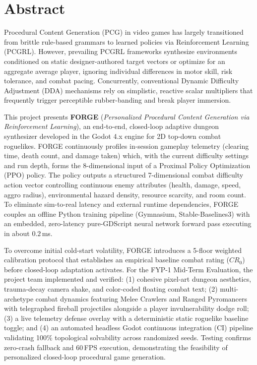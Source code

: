\chapter*{Abstract}

Procedural Content Generation (PCG) in video games has largely transitioned from brittle rule-based grammars to learned policies via Reinforcement Learning (PCGRL). However, prevailing PCGRL frameworks synthesize environments conditioned on static designer-authored target vectors or optimize for an aggregate average player, ignoring individual differences in motor skill, risk tolerance, and combat pacing. Concurrently, conventional Dynamic Difficulty Adjustment (DDA) mechanisms rely on simplistic, reactive scalar multipliers that frequently trigger perceptible rubber-banding and break player immersion.

This project presents \textbf{FORGE} (\textit{Personalized Procedural Content Generation via Reinforcement Learning}), an end-to-end, closed-loop adaptive dungeon synthesizer developed in the Godot 4.x engine for 2D top-down combat roguelikes. FORGE continuously profiles in-session gameplay telemetry (clearing time, death count, and damage taken) which, with the current difficulty settings and run depth, forms the 8-dimensional input of a Proximal Policy Optimization (PPO) policy. The policy outputs a structured 7-dimensional combat difficulty action vector controlling continuous enemy attributes (health, damage, speed, aggro radius), environmental hazard density, resource scarcity, and room count. To eliminate sim-to-real latency and external runtime dependencies, FORGE couples an offline Python training pipeline (Gymnasium, Stable-Baselines3) with an embedded, zero-latency pure-GDScript neural network forward pass executing in about $0.2$\,ms. 

To overcome initial cold-start volatility, FORGE introduces a 5-floor weighted calibration protocol that establishes an empirical baseline combat rating ($CR_0$) before closed-loop adaptation activates. For the FYP-1 Mid-Term Evaluation, the project team implemented and verified: (1) cohesive pixel-art dungeon aesthetics, trauma-decay camera shake, and color-coded floating combat text; (2) multi-archetype combat dynamics featuring Melee Crawlers and Ranged Pyromancers with telegraphed fireball projectiles alongside a player invulnerability dodge roll; (3) a live telemetry defense overlay with a deterministic static roguelike baseline toggle; and (4) an automated headless Godot continuous integration (CI) pipeline validating 100\% topological solvability across randomized seeds. Testing confirms zero-crash fallback and 60\,FPS execution, demonstrating the feasibility of personalized closed-loop procedural game generation.
